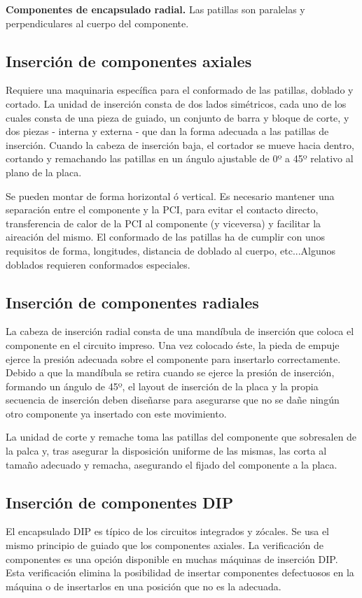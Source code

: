 \textbf{Componentes de encapsulado radial.} Las patillas son paralelas y perpendiculares al cuerpo del componente.

\subsection{Inserción de componentes axiales}
Requiere una maquinaria específica para el conformado de las patillas, doblado y cortado. La unidad de inserción consta de dos lados simétricos, cada uno de los cuales consta de una pieza de guiado, un conjunto de barra y bloque de corte, y dos piezas - interna y externa - que dan la forma adecuada a las patillas de inserción. Cuando la cabeza de inserción baja, el cortador se mueve hacia dentro, cortando y remachando las patillas en un ángulo ajustable de 0º a 45º relativo al plano de la placa.

Se pueden montar de forma horizontal ó vertical. Es necesario mantener una separación entre el componente y la PCI, para evitar el contacto directo, transferencia de calor de la PCI al componente (y viceversa) y facilitar la aireación del mismo. El conformado de las patillas ha de cumplir con unos requisitos de forma, longitudes, distancia de doblado al cuerpo, etc...Algunos doblados requieren conformados especiales.

\subsection{Inserción de componentes radiales}
La cabeza de inserción radial consta de una mandíbula de inserción que coloca el componente en el circuito impreso. Una vez colocado éste, la pieda de empuje ejerce la presión adecuada sobre el componente para insertarlo correctamente. Debido a que la mandíbula se retira cuando se ejerce la presión de inserción, formando un ángulo de 45º, el layout de inserción de la placa y la propia secuencia de inserción deben diseñarse para asegurarse que no se dañe ningún otro componente ya insertado con este movimiento.

La unidad de corte y remache toma las patillas del componente que sobresalen de la palca y, tras asegurar la disposición uniforme de las mismas, las corta al tamaño adecuado y remacha, asegurando el fijado del componente a la placa.

\subsection{Inserción de componentes DIP}
El encapsulado DIP es típico de los circuitos integrados y zócales. Se usa el mismo principio de guiado que los componentes axiales. La verificación de componentes es una opción disponible en muchas máquinas de inserción DIP. Esta verificación elimina la posibilidad de insertar componentes defectuosos en la máquina o de insertarlos en una posición que no es la adecuada.

